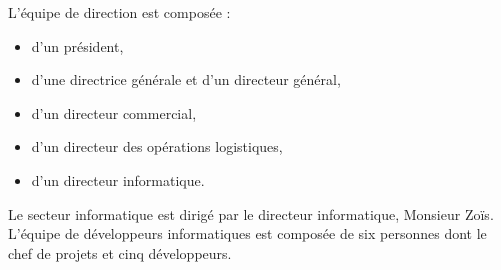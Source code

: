 

	L'équipe de direction est composée :
	\begin{itemize}
		\item d'un président,
		\item d'une directrice générale et d'un directeur général,
		\item d'un directeur commercial,
		\item d'un directeur des opérations logistiques,
		\item d'un directeur informatique.
	\end{itemize}

	Le secteur informatique est dirigé par le directeur informatique, Monsieur Zoïs. L'équipe de développeurs informatiques est composée de six personnes dont le chef de projets et  cinq développeurs.\\
